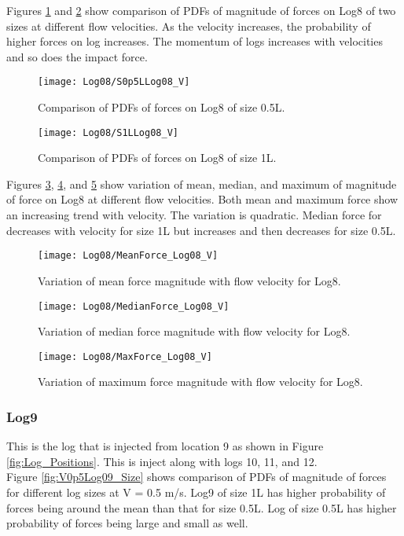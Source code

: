 \noindent Figures \ref{fig:S0p5LLog08_V} and \ref{fig:S1LLog08_V} show comparison of PDFs of magnitude of forces on Log8 of two sizes at different flow velocities. As the velocity increases, the probability of higher forces on log increases. The momentum of logs increases with velocities and so does the impact force.

\begin{figure}
\centering
\texttt{[image: Log08/S0p5LLog08\_V]}
\caption{\label{fig:S0p5LLog08_V}Comparison of PDFs of forces on Log8 of size 0.5L.}
\end{figure}
\begin{figure}
\centering
\texttt{[image: Log08/S1LLog08\_V]}
\caption{\label{fig:S1LLog08_V}Comparison of PDFs of forces on Log8 of size 1L.}
\end{figure}

\noindent Figures \ref{fig:MeanForce_Log08_V}, \ref{fig:MedianForce_Log08_V}, and \ref{fig:MaxForce_Log08_V} show variation of mean, median, and maximum of magnitude of force on Log8 at different flow velocities. Both mean and maximum force show an increasing trend with velocity. The variation is quadratic. Median force for decreases with velocity for size 1L but increases and then decreases for size 0.5L.

\begin{figure}
\centering
\texttt{[image: Log08/MeanForce\_Log08\_V]}
\caption{\label{fig:MeanForce_Log08_V}Variation of mean force magnitude with flow velocity for Log8.}
\end{figure}
\begin{figure}
\centering
\texttt{[image: Log08/MedianForce\_Log08\_V]}
\caption{\label{fig:MedianForce_Log08_V}Variation of median force magnitude with flow velocity for Log8.}
\end{figure}
\begin{figure}
\centering
\texttt{[image: Log08/MaxForce\_Log08\_V]}
\caption{\label{fig:MaxForce_Log08_V}Variation of maximum force magnitude with flow velocity for Log8.}
\end{figure}

\FloatBarrier
\subsubsection{Log9}
This is the log that is injected from location 9 as shown in Figure \ref{fig:Log_Positions}. This is inject along with logs 10, 11, and 12.\\ 
Figure \ref{fig:V0p5Log09_Size} shows comparison of PDFs of magnitude of forces for different log sizes at V = 0.5 m/s. Log9 of size 1L has higher probability of forces being around the mean than that for size 0.5L. Log of size 0.5L has higher probability of forces being large and small as well.

